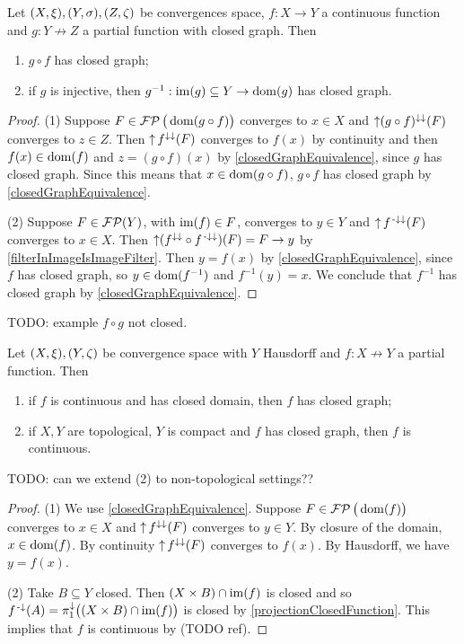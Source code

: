 \begin{proposition} \label{closedGraphFunctionConstructions}
Let $\sSet{X,\xi}, \sSet{Y,\sigma}, \sSet{Z,\zeta}$ be convergences space, $f: X\to Y$ a continuous function and $g:Y\not\to Z$ a partial function with closed graph. Then
\begin{enumerate}
\item $g\circ f$ has closed graph;
\item if $g$ is injective, then $g^{-1}: \operatorname{im}(g)\subseteq Y\to \operatorname{dom}(g)$ has closed graph.
\end{enumerate}
\end{proposition}
\begin{proof}
(1) Suppose $F\in \operatorname{\mathcal{FP}}\big(\operatorname{dom}(g\circ f)\big)$ converges to $x\in X$ and $\operatorname{\uparrow} (g\circ f)^{\downarrow\downarrow}(F)$ converges to $z\in Z$. Then $\operatorname{\uparrow} f^{\downarrow\downarrow}(F)$ converges to $f(x)$ by continuity and then $f(x)\in\operatorname{dom}(f)$ and $z= (g\circ f)(x)$ by \ref{closedGraphEquivalence}, since $g$ has closed graph. Since this means that $x\in \operatorname{dom}(g\circ f)$, $g\circ f$ has closed graph by \ref{closedGraphEquivalence}.

(2) Suppose $F\in \operatorname{\mathcal{FP}}(Y)$, with $\operatorname{im}(f)\in F$, converges to $y\in Y$ and $\operatorname{\uparrow} f^{{\text{\hspace{0.15em}-}\downarrow}\downarrow}(F)$ converges to $x\in X$. Then $\operatorname{\uparrow}(f^{\downarrow\downarrow}\circ f^{{\text{\hspace{0.15em}-}\downarrow}\downarrow})(F) = F \to y$ by \ref{filterInImageIsImageFilter}. Then $y = f(x)$ by \ref{closedGraphEquivalence}, since $f$ has closed graph, so $y\in \operatorname{dom}(f^{-1})$ and $f^{-1}(y) = x$. We conclude that $f^{-1}$ has closed graph by \ref{closedGraphEquivalence}.
\end{proof}

TODO: example $f\circ g$ not closed.

\begin{proposition} \label{continuousFunctionClosedGraph}
Let $\sSet{X,\xi}, \sSet{Y,\zeta}$ be convergence space with $Y$ Hausdorff and $f: X\not\to Y$ a partial function. Then
\begin{enumerate}
\item if $f$ is continuous and has closed domain, then $f$ has closed graph;
\item if $X,Y$ are topological, $Y$ is compact and $f$ has closed graph, then $f$ is continuous.
\end{enumerate}
\end{proposition}
TODO: can we extend (2) to non-topological settings??
\begin{proof}
(1) We use \ref{closedGraphEquivalence}. Suppose $F\in \operatorname{\mathcal{FP}}\big(\operatorname{dom}(f)\big)$ converges to $x\in X$ and $\operatorname{\uparrow} f^{\downarrow\downarrow}(F)$ converges to $y\in Y$. By closure of the domain, $x\in \operatorname{dom}(f)$. By continuity $\operatorname{\uparrow} f^{\downarrow\downarrow}(F)$ converges to $f(x)$. By Hausdorff, we have $y = f(x)$.

(2) Take $B\subseteq Y$ closed. Then $(X\times B)\cap \operatorname{im}(f)$ is closed and so $f^{\text{\hspace{0.15em}-}\downarrow}(A) = \pi_1^\downarrow\big((X\times B)\cap \operatorname{im}(f)\big)$ is closed by \ref{projectionClosedFunction}. This implies that $f$ is continuous by (TODO ref).
\end{proof}


